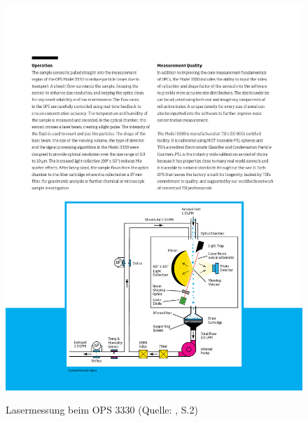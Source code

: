 \begin{figure}[H]
	\myfloatalign
	{\includegraphics[width=.9\linewidth]{gfx/requirements/ops_3330.pdf}} \quad
	\caption[Lasermessung beim OPS 3330 (Quelle: \cite{ops_3330}, S.2)]
	{Lasermessung beim OPS 3330 (Quelle: \cite{ops_3330}, S.2)}
	\label{fig:laser_messer}
\end{figure}

